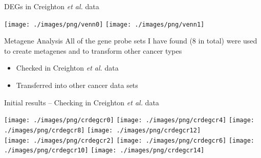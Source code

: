\documentclass[handout]{beamer}
\begin{document}

\begin{frame}{DEGs in Creighton \textit{et al.} data}
	\begin{center}
		\texttt{[image: ./images/png/venn0]}
		\texttt{[image: ./images/png/venn1]}
	\end{center}
\end{frame}

\begin{frame}{Metagene Analysis}
	All of the gene probe sets I have found (8 in total) were used to create metagenes and to transform other cancer types
	\begin{itemize}
		\item Checked in Creighton \textit{et al.} data
		\item Transferred into other cancer data sets
	\end{itemize}
\end{frame}

\begin{frame}{Initial results -- Checking in Creighton \textit{et al.} data}
	\begin{adjustwidth}{-1.5em}{-1.5em}
		\texttt{[image: ./images/png/crdegcr0]}
		\texttt{[image: ./images/png/crdegcr4]}
		\texttt{[image: ./images/png/crdegcr8]}
		\texttt{[image: ./images/png/crdegcr12]}\\
		\texttt{[image: ./images/png/crdegcr2]}
		\texttt{[image: ./images/png/crdegcr6]}
		\texttt{[image: ./images/png/crdegcr10]}
		\texttt{[image: ./images/png/crdegcr14]}
	\end{adjustwidth}
\end{frame}
\end{document}
